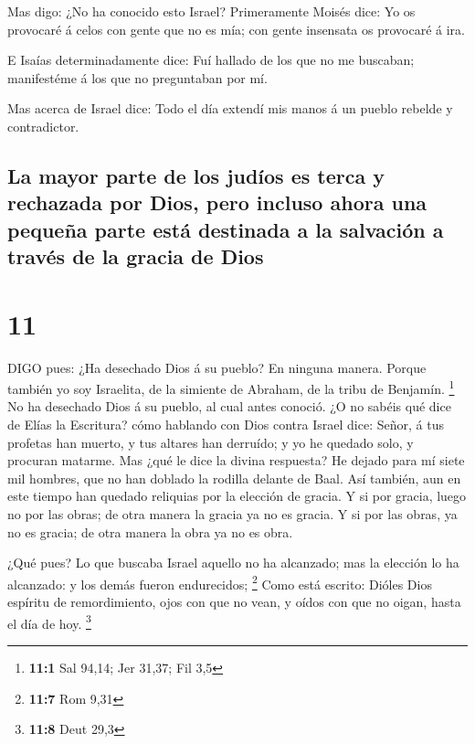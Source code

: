  Mas digo: ¿No ha conocido esto Israel? Primeramente Moisés
dice: Yo os provocaré á celos con gente que no es mía; con gente
insensata os provocaré á ira.

 E Isaías determinadamente dice: Fuí hallado de los que no
me buscaban; manifestéme á los que no preguntaban por mí.

 Mas acerca de Israel dice: Todo el día extendí mis manos á
un pueblo rebelde y contradictor.

\hypertarget{la-mayor-parte-de-los-juduxedos-es-terca-y-rechazada-por-dios-pero-incluso-ahora-una-pequeuxf1a-parte-estuxe1-destinada-a-la-salvaciuxf3n-a-travuxe9s-de-la-gracia-de-dios}{%
\subsection{La mayor parte de los judíos es terca y rechazada por Dios,
pero incluso ahora una pequeña parte está destinada a la salvación a
través de la gracia de
Dios}\label{la-mayor-parte-de-los-juduxedos-es-terca-y-rechazada-por-dios-pero-incluso-ahora-una-pequeuxf1a-parte-estuxe1-destinada-a-la-salvaciuxf3n-a-travuxe9s-de-la-gracia-de-dios}}

\hypertarget{section-10}{%
\section{11}\label{section-10}}

 DIGO pues: ¿Ha desechado Dios á su pueblo? En ninguna
manera. Porque también yo soy Israelita, de la simiente de Abraham, de
la tribu de Benjamín. \footnote{\textbf{11:1} Sal 94,14; Jer 31,37; Fil
  3,5}  No ha desechado Dios á su pueblo, al cual antes
conoció. ¿O no sabéis qué dice de Elías la Escritura? cómo hablando con
Dios contra Israel dice:  Señor, á tus profetas han muerto,
y tus altares han derruído; y yo he quedado solo, y procuran matarme.
 Mas ¿qué le dice la divina respuesta? He dejado para mí
siete mil hombres, que no han doblado la rodilla delante de Baal.
 Así también, aun en este tiempo han quedado reliquias por
la elección de gracia.  Y si por gracia, luego no por las
obras; de otra manera la gracia ya no es gracia. Y si por las obras, ya
no es gracia; de otra manera la obra ya no es obra.

 ¿Qué pues? Lo que buscaba Israel aquello no ha alcanzado;
mas la elección lo ha alcanzado: y los demás fueron endurecidos;
\footnote{\textbf{11:7} Rom 9,31}  Como está escrito: Dióles
Dios espíritu de remordimiento, ojos con que no vean, y oídos con que no
oigan, hasta el día de hoy. \footnote{\textbf{11:8} Deut 29,3}

